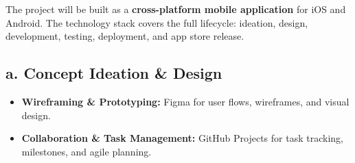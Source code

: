 \documentclass{article}
\begin{document}





The project will be built as a \textbf{cross-platform mobile application} for iOS and Android. The technology stack covers the full lifecycle: ideation, design, development, testing, deployment, and app store release.

\subsection*{a. Concept Ideation \& Design}
\begin{itemize}
    \item \textbf{Wireframing \& Prototyping:} Figma for user flows, wireframes, and visual design.
    \item \textbf{Collaboration \& Task Management:} GitHub Projects for task tracking, milestones, and agile planning.
\end{itemize}
\end{document}
